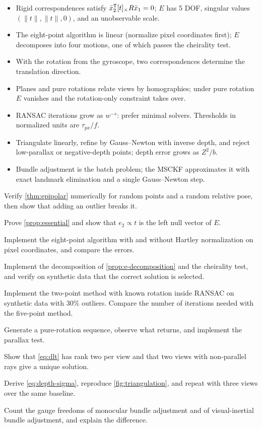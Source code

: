 \begin{takeaways}
\begin{itemize}
  \item Rigid correspondences satisfy $\bar x_2^{\mathsf{T}}[t]_{\times}R\bar x_1 = 0$; $E$ has 5 DOF, singular values $(\|t\|, \|t\|, 0)$, and an unobservable scale.
  \item The eight-point algorithm is linear (normalize pixel coordinates first); $E$ decomposes into four motions, one of which passes the cheirality test.
  \item With the rotation from the gyroscope, two correspondences determine the translation direction.
  \item Planes and pure rotations relate views by homographies; under pure rotation $E$ vanishes and the rotation-only constraint takes over.
  \item RANSAC iterations grow as $w^{-s}$: prefer minimal solvers. Thresholds in normalized units are $\tau_{px}/f$.
  \item Triangulate linearly, refine by Gauss--Newton with inverse depth, and reject low-parallax or negative-depth points; depth error grows as $Z^2/b$.
  \item Bundle adjustment is the batch problem; the MSCKF approximates it with exact landmark elimination and a single Gauss--Newton step.
\end{itemize}
\end{takeaways}

\begin{exercises}
  \item Verify \cref{thm:epipolar} numerically for random points and a random relative pose, then show that adding an outlier breaks it.
  \item Prove \cref{prop:essential} and show that $e_2 \propto t$ is the left null vector of $E$.
  \item Implement the eight-point algorithm with and without Hartley normalization on pixel coordinates, and compare the errors.
  \item Implement the decomposition of \cref{prop:e-decomposition} and the cheirality test, and verify on synthetic data that the correct solution is selected.
  \item Implement the two-point method with known rotation inside RANSAC on synthetic data with 30\% outliers. Compare the number of iterations needed with the five-point
        method.
  \item Generate a pure-rotation sequence, observe what  returns, and implement the parallax test.
  \item Show that \eqref{eq:dlt} has rank two per view and that two views with non-parallel rays give a unique solution.
  \item Derive \eqref{eq:depth-sigma}, reproduce \cref{fig:triangulation}, and repeat with three views over the same baseline.
  \item Count the gauge freedoms of monocular bundle adjustment and of visual-inertial bundle adjustment, and explain the difference.
\end{exercises}

